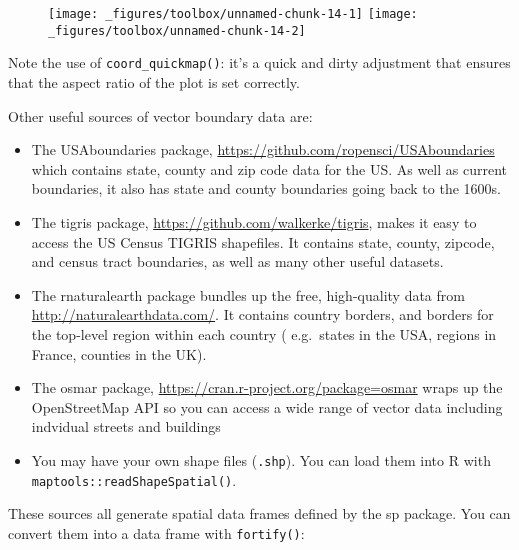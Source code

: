 \begin{figure}[H]
  \texttt{[image: \_figures/toolbox/unnamed-chunk-14-1]}%
  \texttt{[image: \_figures/toolbox/unnamed-chunk-14-2]}
\end{figure}

Note the use of \texttt{coord\_quickmap()}: it's a quick and dirty
adjustment that ensures that the aspect ratio of the plot is set
correctly.

Other useful sources of vector boundary data are:

\begin{itemize}
\item
  The USAboundaries package,
  \url{https://github.com/ropensci/USAboundaries} which contains state,
  county and zip code data for the US. As well as current boundaries, it
  also has state and county boundaries going back to the 1600s.
\item
  The tigris package, \url{https://github.com/walkerke/tigris}, makes it
  easy to access the US Census TIGRIS shapefiles. It contains state,
  county, zipcode, and census tract boundaries, as well as many other
  useful datasets.
\item
  The rnaturalearth package bundles up the free, high-quality data from
  \url{http://naturalearthdata.com/}. It contains country borders, and
  borders for the top-level region within each country ( e.g.~states in
  the USA, regions in France, counties in the UK).
\item
  The osmar package, \url{https://cran.r-project.org/package=osmar}
  wraps up the OpenStreetMap API so you can access a wide range of
  vector data including indvidual streets and buildings
\item
  You may have your own shape files (\texttt{.shp}). You can load them
  into R with \texttt{maptools::readShapeSpatial()}.
\end{itemize}

These sources all generate spatial data frames defined by the sp
package. You can convert them into a data frame with \texttt{fortify()}:


